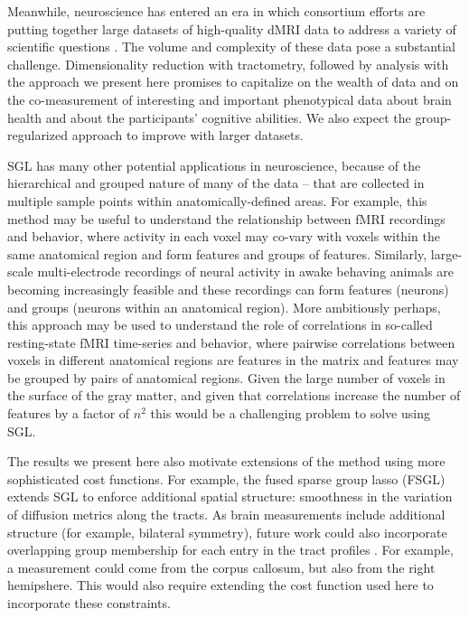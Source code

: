 Meanwhile, neuroscience has entered an era in which consortium efforts are
putting together large datasets of high-quality dMRI data to address a variety
of scientific questions \cite{jernigan2016ping, jernigan2018abcd,
alexander2017open, Miller2016-hw, VanEssen2012}. The volume and complexity of
these data pose a substantial challenge. Dimensionality reduction with
tractometry, followed by analysis with the approach we present here promises to
capitalize on the wealth of data and on the co-measurement of interesting and
important phenotypical data about brain health and about the participants'
cognitive abilities. We also expect the group-regularized approach to improve
with larger datasets.

SGL has many other potential applications in neuroscience, because of the
hierarchical and grouped nature of many of the data -- that are collected in
multiple sample points within anatomically-defined areas. For example, this
method may be useful to understand the relationship between fMRI recordings and
behavior, where activity in each voxel may co-vary with voxels within the same
anatomical region and form features and groups of features. Similarly,
large-scale multi-electrode recordings of neural activity in awake behaving
animals are becoming increasingly feasible \cite{steinmetz2018distributed,
Jun2017-gv} and these recordings can form features (neurons) and groups (neurons
within an anatomical region). More ambitiously perhaps, this approach may be
used to understand the role of correlations in so-called resting-state fMRI
time-series and behavior, where pairwise correlations between voxels in
different anatomical regions are features in the matrix and features may be
grouped by pairs of anatomical regions. Given the large number of voxels in the
surface of the gray matter, and given that correlations increase the number of
features by a factor of $n^2$ this would be a challenging problem to solve using
SGL.

The results we present here also motivate extensions of the method using more
sophisticated cost functions. For example, the fused sparse group lasso (FSGL)
\cite{zhou2012} extends SGL to enforce additional spatial structure: smoothness
in the variation of diffusion metrics along the tracts. As brain measurements
include additional structure (for example, bilateral symmetry), future work
could also incorporate overlapping group membership for each entry in the tract
profiles \cite{Rao2014-xm}. For example, a measurement could come from the
corpus callosum, but also from the right hemipshere. This would also require
extending the cost function used here to incorporate these constraints.


